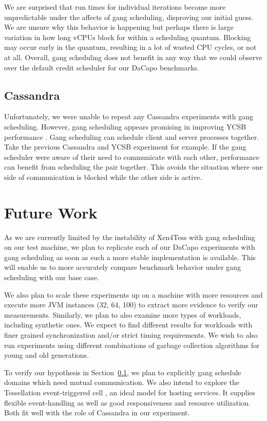 \documentclass{sig-alternate}
\begin{document}
We are surprised that run times for individual iterations become more unpredictable under the affects of gang scheduling, disproving our initial guess. We are unsure why this behavior is happening but perhaps there is large variation in how long vCPUs block for within a scheduling quantum. Blocking may occur early in the quantum, resulting in a lot of wasted CPU cycles, or not at all. Overall, gang scheduling does not benefit in any way that we could observe over the default credit scheduler for our DaCapo benchmarks.

\subsection{Cassandra} \label{subsec:cassandragang}
Unfortunately, we were unable to repeat any Cassandra experiments with gang scheduling. However, gang scheduling appears promising in improving YCSB performance  \cite{feitelson1992gang}. Gang scheduling can schedule client and server processes together. Take the previous Cassandra and YCSB experiment for example. If the gang scheduler were aware of their need to communicate with each other, performance can benefit from scheduling the pair together. This avoids the situation where one side of communication is blocked while the other side is active.

\section{Future Work} \label{sec:futurework}
As we are currently limited by the instability of Xen4Tess with gang scheduling on our test machine, we plan to replicate each of our DaCapo experiments with gang scheduling as soon as such a more stable implementation is available. This will enable us to more accurately compare benchmark behavior under gang scheduling with our base case.

We also plan to scale these experiments up on a machine with more resources and execute more JVM instances (32, 64, 100) to extract more evidence to verify our measurements. Similarly, we plan to also examine more types of workloads, including synthetic ones. We expect to find different results for workloads with finer grained synchronization and/or strict timing requirements. We wish to also run experiments using different combinations of garbage collection algorithms for young and old generations.

To verify our hypothesis in Section~\ref{subsec:cassandragang}, we plan to explicitly gang schedule domains which need mutual communication. We also intend to explore the Tessellation event-triggered cell \cite{colmenares2013tessellation}, an ideal model for hosting services. It supplies flexible event-handling as well as good responsiveness and resource utilization. Both fit well with the role of Cassandra in our experiment.
\end{document}
